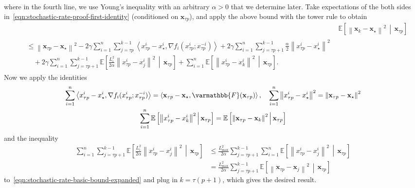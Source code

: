 \documentclass{article}
\newcommand{\vx}{{\mathbf{x}}}
\newcommand{\opF}{{\varmathbb{F}}}
\newcommand{\inprod}[2]{\left\langle #1,#2 \right\rangle}
\newcommand{\sqnorm}[1]{\left\| #1 \right\|^2}
\theoremstyle{plain}
\theoremstyle{remark}
\begin{document}
where in the fourth line, we use Young's inequality with an arbitrary $\alpha > 0$ that we determine later.
Take expectations of the both sides in~\eqref{eqn:stochastic-rate-proof-first-identity} (conditioned on $\vx_{\tau p}$), and apply the above bound with the tower rule to obtain
\begin{align}
    & \mathbb{E} \left[\sqnorm{\vx_k - \vx_\star} \,\middle|\, \vx_{\tau p} \right] \nonumber \\
    \begin{split}
    & \le \sqnorm{\vx_{\tau p} - \vx_\star} - 2\gamma\sum_{i=1}^n \sum_{j=\tau p}^{k-1} \inprod{x_{\tau p}^i - x_\star^i}{\nabla f_i (x_{\tau p}^i; x_{\tau p}^{-i})} + 2\gamma\sum_{i=1}^n \sum_{j=\tau p+1}^{k-1} \frac{\alpha}{2} \sqnorm{x_{\tau p}^i - x_\star^i} \\
    & \quad + 2\gamma\sum_{i=1}^n \sum_{j=\tau p+1}^{k-1} \mathbb{E} \left[ \frac{L_i^2}{2\alpha} \sqnorm{x_{\tau p}^i - x_{j}^i} \,\middle|\, \vx_{\tau p} \right] + \sum_{i=1}^n \mathbb{E} \left[ \sqnorm{x_{\tau p}^i - x_{k}^i} \,\middle|\, \vx_{\tau p} \right] .
    \end{split}
    \label{eqn:stochastic-rate-basic-bound-expanded}
\end{align}
Now we apply the identities
\begin{gather*}
    \sum_{i=1}^n \inprod{x_{\tau p}^i - x_\star^i}{\nabla f_i (x_{\tau p}^i; x_{\tau p}^{-i})} = \inprod{\vx_{\tau p} - \vx_\star}{\opF(\vx_{\tau p})}, \quad \sum_{i=1}^n \sqnorm{x_{\tau p}^i - x_\star^i} = \sqnorm{\vx_{\tau p} - \vx_\star} \\
    \sum_{i=1}^n \mathbb{E} \left[ \sqnorm{x_{\tau p}^i - x_{k}^i} \,\middle|\, \vx_{\tau p} \right] = \mathbb{E} \left[ \sqnorm{\vx_{\tau p} - \vx_k} \,\middle|\, \vx_{\tau p} \right]
\end{gather*}
and the inequality
\begin{align*}
    \sum_{i=1}^n \sum_{j=\tau p+1}^{k-1} \mathbb{E} \left[ \frac{L_i^2}{2\alpha} \sqnorm{x_{\tau p}^i - x_{j}^i} \,\middle|\, \vx_{\tau p} \right] & \le \frac{L_{\mathrm{max}}^2}{2\alpha}\sum_{j=\tau p+1}^{k-1} 
    \sum_{i=1}^n \mathbb{E} \left[  \sqnorm{x_{\tau p}^i - x_{j}^i} \,\middle|\, \vx_{\tau p} \right] \\
    & = \frac{L_{\mathrm{max}}^2}{2\alpha}\sum_{j=\tau p+1}^{k-1} 
    \mathbb{E} \left[  \sqnorm{\vx_{\tau p} - \vx_{j}} \,\middle|\, \vx_{\tau p} \right]
\end{align*}
to~\eqref{eqn:stochastic-rate-basic-bound-expanded} and plug in $k=\tau(p+1)$, which gives the desired result.
\end{document}
